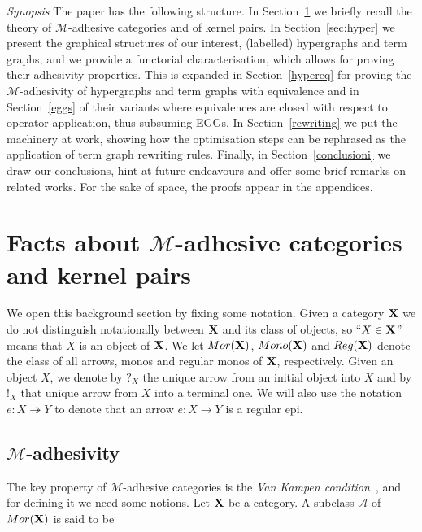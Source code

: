 \documentclass[a4paper,UKenglish,cleveref,pdftex,thm-restate,numberwithinsect]{lipics-v2021}
\def\X{\textbf {\textup{X}}}
\newcommand{\mor}{\mathsf{Mor}}
\newcommand{\mon}{\mathsf{Mono}}
\newcommand{\reg}{\mathsf{Reg}}
\newcommand{\eto}{\twoheadrightarrow}
\begin{document}
\emph{Synopsis}
The paper has the following structure. 
In Section~\ref{sec:ade} we briefly recall 
the theory of $\mathcal{M}$-adhesive categories
and of kernel pairs.
In Section~\ref{sec:hyper} we present the graphical structures of our interest, 
 (labelled) hypergraphs and term graphs, and we provide a
functorial characterisation, which allows for proving their adhesivity properties.
This is expanded in Section~\ref{hypereq} for proving the $\mathcal{M}$-adhesivity
of hypergraphs 
and term graphs with equivalence and in Section~\ref{eggs} of
their variants where equivalences are closed with respect to operator application,
thus subsuming EGGs.
%
In Section~\ref{rewriting} we put the machinery at work, showing how the optimisation steps
can be rephrased as the application of term graph rewriting rules.
%
Finally, in Section~\ref{conclusioni} we draw our conclusions, hint at future endeavours and offer some 
brief remarks on related works.
%
For the sake of space, the proofs appear in the appendices. 

\section{Facts about $\mathcal{M}$-adhesive categories and kernel pairs}\label{sec:ade}


%
We open this background section by fixing some notation.
%
Given a category $\X$ we do not distinguish notationally between $\X$ and its class of objects, so
``$X\in \X$'' means that $X$ is an object of $\X$. We let $\mor(\X)$, $\mon(\X)$ and $\reg(\X)$ denote the class of all arrows, monos and regular monos of $\X$, respectively.  Given an object $X$, we  denote by $?_X$ the unique arrow from an initial object into $X$ and by $!_X$ that  unique arrow from $X$ into a terminal one. We will also use the notation $e\colon X\eto Y$ to denote that an arrow $e\colon X\to Y$ is a regular epi. 

\subsection{$\mathcal{M}$-adhesivity}\label{subsec:ade}
The key property of $\mathcal{M}$-adhesive categories is the \emph{Van Kampen condition}~\cite{brown1997van,johnstone2007quasitoposes,lack2005adhesive},
%
and for defining it we need some notions.
Let  $\X$ be a category. A subclass $\mathcal{A}$ of $\mor(\X)$ is said to be
\end{document}
